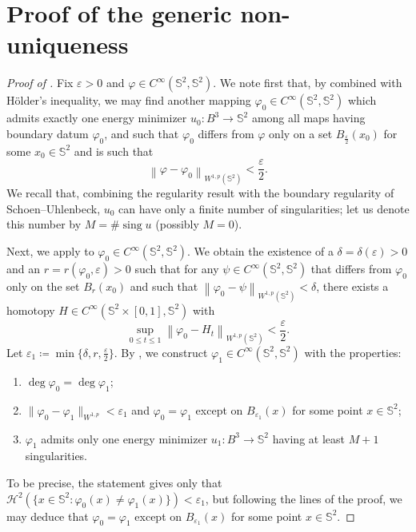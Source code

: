 \documentclass[12pt]{amsart}
\newcommand{\sing}{\operatorname{sing}}
\def\eps{\varepsilon}
\def\S{{\mathbb S}}
\newcommand{\norm}[1]{\left\|{#1}\right\|}
\numberwithin{theorem}{section} \numberwithin{equation}{section}
\begin{document}
\section{Proof of the generic non-uniqueness}\label{s:proof}
\begin{proof}[Proof of ]
Fix $\eps>0$ and $\varphi \in C^\infty(\S^2,\S^2)$. 
We note first that, by  combined with H\"{o}lder's inequality, we may find another mapping $\varphi_0 \in C^{\infty}(\S^2,\S^2)$ which admits exactly one energy minimizer $u_0\colon B^3\to\S^2$ among all maps having boundary datum $\varphi_0$, and such that \(\varphi_{0} \) differs from $\varphi$ only on a set $B_\frac\eps2(x_0)$ for some $x_0\in\S^2$ and is such that
\begin{equation}\label{eq:phiphi0difference}
\norm{\varphi - \varphi_0}_{W^{1,p}(\S^2)} <\frac{\eps}{2}\text{.}
\end{equation}
We recall that, combining the regularity result \cite[Theorem II]{SU1} with the boundary regularity \cite[Theorem 2.7]{SU2} of Schoen--Uhlenbeck, $u_0$ can have only a finite number of singularities; let us denote this number by $M = \#\sing u$ (possibly $M=0$).

Next, we apply  to $\varphi_0\in C^\infty(\S^2,\S^2)$. We obtain the existence of a $\delta=\delta(\eps)>0$ and an $r=r(\varphi_0,\eps)>0$ such that for any $\psi\in C^{\infty}(\S^2,\S^2)$ that differs from $\varphi_0$ only on the set $B_r(x_0)$ and such that $\norm{\varphi_0-\psi}_{W^{1,p}(\S^2)}<\delta$, there exists a homotopy $H\in C^\infty(\S^2 \times [0,1],\S^2)$ with
\begin{equation}\label{eq:specialhomotopy}
 \sup_{0\le t \le 1} \norm{\varphi_0 - H_t}_{W^{1,p}(\S^2)}<\frac \eps 2.
\end{equation}
Let $\eps_1 \coloneqq \min\{\delta,r,\frac \eps 2\}$. 
By \cite[Theorem 2.3.1]{MazowieckaPhD}, we construct $\varphi_1 \in C^{\infty}(\S^2,\S^2)$ with the properties:
\begin{enumerate}
 \item $\deg \varphi_0 = \deg \varphi_1$;
 \item $\|\varphi_0 - \varphi_1\|_{W^{1,p}}<\eps_1$ and $\varphi_0 = \varphi_1$ except on $B_{\eps_1}(x)$ for some point $x\in\S^2$;
 \item $\varphi_1$ admits only one energy minimizer $u_1\colon B^3 \to \S^2$ having at least $M + 1$ singularities.
\end{enumerate}
To be precise, the statement \cite[Theorem 2.3.1]{MazowieckaPhD} gives only that $\mathcal H^2(\{x\in\S^2\colon \varphi_0(x) \neq \varphi_1(x)\})<\eps_1$, but following the lines of the proof, we may deduce that $\varphi_0 = \varphi_1$ except on $B_{\eps_1}(x)$ for some point $x\in\S^2$.


\end{proof}
\end{document}
